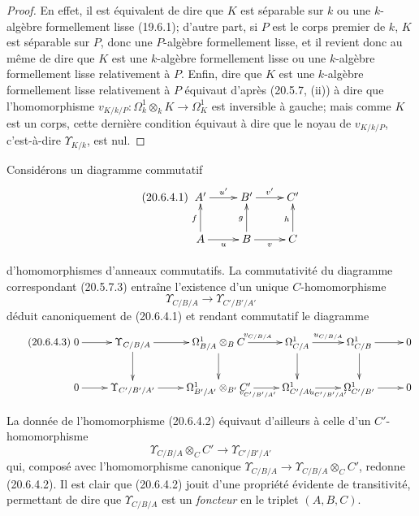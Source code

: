 \begin{proof}
En effet, il est équivalent de dire que $K$ est séparable sur $k$ ou une
$k$-algèbre formellement lisse (19.6.1); d'autre part, si $P$ est le
corps premier de $k$, $K$ est séparable sur $P$, donc une $P$-algèbre
formellement lisse, et il revient donc au même de dire que $K$ est une
$k$-algèbre formellement lisse ou une $k$-algèbre formellement lisse
relativement à $P$. Enfin, dire que $K$ est une $k$-algèbre formellement
lisse relativement à $P$ équivaut d'après (20.5.7, (ii)) à dire que
l'homomorphisme
$v_{K/k/P}:\Omega^1_k\otimes_k K\to\Omega^1_K$ est inversible à gauche;
mais comme $K$ est un corps, cette dernière condition équivaut à dire
que le noyau de $v_{K/k/P}$, c'est-à-dire $\Upsilon_{K/k}$, est nul.
\end{proof}

\begin{env}[20.6.4]
\label{0.20.6.4-fr}
Considérons un diagramme commutatif
\begin{equation}
\tag{20.6.4.1}
\label{0.20.6.4.1-fr}
\xymatrix{
  A' \ar[r]^{u'} & B' \ar[r]^{v'} & C' \\
  A \ar[u]^f \ar[r]_u & B \ar[u]^g \ar[r]_v & C \ar[u]^h
}
\end{equation}

d'homomorphismes d'anneaux commutatifs. La commutativité du diagramme
correspondant (20.5.7.3) entraîne l'existence d'un unique
$C$-homomorphisme
\begin{equation}
\tag{20.6.4.2}
\label{0.20.6.4.2-fr}
  \Upsilon_{C/B/A}\longrightarrow\Upsilon_{C'/B'/A'}
\end{equation}
déduit canoniquement de (20.6.4.1) et rendant commutatif le diagramme
\begin{equation}
\tag{20.6.4.3}
\label{0.20.6.4.3-fr}
\xymatrix{
  0 \ar[r] & \Upsilon_{C/B/A} \ar[r] \ar[d] &
  \Omega^1_{B/A}\otimes_B C \ar[r]^{v_{C/B/A}} \ar[d] &
  \Omega^1_{C/A} \ar[r]^{u_{C/B/A}} \ar[d] &
  \Omega^1_{C/B} \ar[r] \ar[d] & 0 \\
  0 \ar[r] & \Upsilon_{C'/B'/A'} \ar[r] &
  \Omega^1_{B'/A'}\otimes_{B'} C' \ar[r]_{v_{C'/B'/A'}} &
  \Omega^1_{C'/A'} \ar[r]_{u_{C'/B'/A'}} &
  \Omega^1_{C'/B'} \ar[r] & 0
}
\end{equation}

La donnée de l'homomorphisme (20.6.4.2) équivaut d'ailleurs à celle d'un
$C'$-homomorphisme
\begin{equation}
\tag{20.6.4.4}
\label{0.20.6.4.4-fr}
  \Upsilon_{C/B/A}\otimes_C C'\longrightarrow\Upsilon_{C'/B'/A'}
\end{equation}
qui, composé avec l'homomorphisme canonique
$\Upsilon_{C/B/A}\to\Upsilon_{C/B/A}\otimes_C C'$, redonne (20.6.4.2).
Il est clair que (20.6.4.2) jouit d'une propriété évidente de
transitivité, permettant de dire que $\Upsilon_{C/B/A}$ est un
\emph{foncteur} en le triplet $(A,B,C)$.
\end{env}

